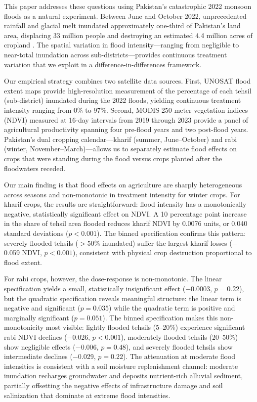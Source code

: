 \documentclass[12pt]{article}
\begin{document}
This paper addresses these questions using Pakistan's catastrophic 2022 monsoon floods as a natural experiment. Between June and October 2022, unprecedented rainfall and glacial melt inundated approximately one-third of Pakistan's land area, displacing 33 million people and destroying an estimated 4.4 million acres of cropland \citep{WorldBank2022}. The spatial variation in flood intensity---ranging from negligible to near-total inundation across sub-districts---provides continuous treatment variation that we exploit in a difference-in-differences framework.

Our empirical strategy combines two satellite data sources. First, UNOSAT flood extent maps provide high-resolution measurement of the percentage of each tehsil (sub-district) inundated during the 2022 floods, yielding continuous treatment intensity ranging from 0\% to 97\%. Second, MODIS 250-meter vegetation indices (NDVI) measured at 16-day intervals from 2019 through 2023 provide a panel of agricultural productivity spanning four pre-flood years and two post-flood years. Pakistan's dual cropping calendar---kharif (summer, June--October) and rabi (winter, November--March)---allows us to separately estimate flood effects on crops that were standing during the flood versus crops planted after the floodwaters receded.

Our main finding is that flood effects on agriculture are sharply heterogeneous across seasons and non-monotonic in treatment intensity for winter crops. For kharif crops, the results are straightforward: flood intensity has a monotonically negative, statistically significant effect on NDVI. A 10 percentage point increase in the share of tehsil area flooded reduces kharif NDVI by 0.0076 units, or 0.040 standard deviations ($p < 0.001$). The binned specification confirms this pattern: severely flooded tehsils ($>$50\% inundated) suffer the largest kharif losses ($-$0.059 NDVI, $p < 0.001$), consistent with physical crop destruction proportional to flood extent.

For rabi crops, however, the dose-response is non-monotonic. The linear specification yields a small, statistically insignificant effect ($-$0.0003, $p = 0.22$), but the quadratic specification reveals meaningful structure: the linear term is negative and significant ($p = 0.035$) while the quadratic term is positive and marginally significant ($p = 0.051$). The binned specification makes this non-monotonicity most visible: lightly flooded tehsils (5--20\%) experience significant rabi NDVI declines ($-$0.026, $p < 0.001$), moderately flooded tehsils (20--50\%) show negligible effects ($-$0.006, $p = 0.48$), and severely flooded tehsils show intermediate declines ($-$0.029, $p = 0.22$). The attenuation at moderate flood intensities is consistent with a soil moisture replenishment channel: moderate inundation recharges groundwater and deposits nutrient-rich alluvial sediment, partially offsetting the negative effects of infrastructure damage and soil salinization that dominate at extreme flood intensities.
\end{document}
